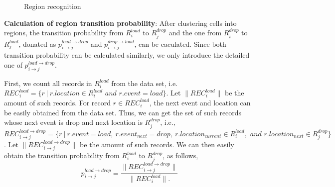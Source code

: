 \begin{figure}[!t]
\centering
{}
\centering
\caption{Region recognition}\label{figure_region_recognizition}
\end{figure}

\textbf{Calculation of region transition probability}: After clustering cells into regions, the transition probability from $R_i^{load}$ to $R_j^{drop}$ and the one from $R_i^{drop}$ to $R_j^{load}$, donated as $p_{i\rightarrow j}^{load\rightarrow drop}$ and $p_{i\rightarrow j}^{drop\rightarrow load}$, can be caculated. Since both transition probability can be calculated similarly, we only introduce the detailed one of $p_{i\rightarrow j}^{load\rightarrow drop}$.

First, we count all records in $R_i^{load}$ from the data set,  i.e. $REC_i^{load}=\{r~|~r.location\in{R_i^{load} \textit{ and }  r.event=load}\}$. Let $\|REC_i^{load}\|$ be the amount of such records. For record $r \in REC_i^{load}$, the next event and location can be easily obtained from the data set. Thus, we can get the set of such records whose next event is drop and next location is $R_j^{drop}$, i.e., $REC_{i\to j}^{load\to drop}=\{r~|~r.event=load,~r.event_{next}=drop,~r.location_{current}\in R_i^{load}, \textit{ and }  r.location_{next}\in R_j^{drop}\}$. Let $\|REC_{i\to j}^{load\to drop}\|$ be the amount of such records. We can then easily obtain the transition probability from $R_i^{load}$ to $R_j^{drop}$, as follows,
\[p_{i \to j}^{load \to drop} = \frac{\|REC_{i\to j}^{load\to drop}\|}{\|REC_i^{load}\|.}\]
